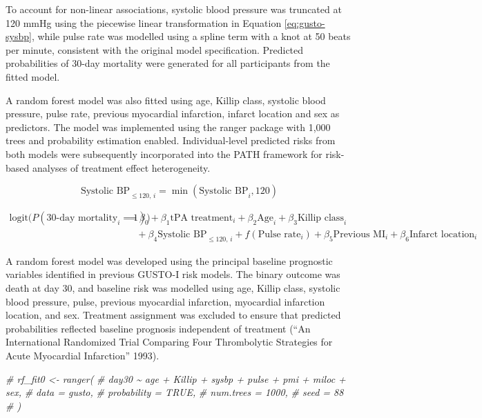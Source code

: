 \documentclass{article}
\newenvironment{Shaded}{\begin{snugshade}}{\end{snugshade}}
\newcommand{\CommentTok}[1]{\textcolor[rgb]{0.56,0.35,0.01}{\textit{#1}}}
\begin{document}
To account for non-linear associations, systolic blood pressure was
truncated at 120 mmHg using the piecewise linear transformation in
Equation \ref{eq:gusto-sysbp}, while pulse rate was modelled using a
spline term with a knot at 50 beats per minute, consistent with the
original model specification. Predicted probabilities of 30-day
mortality were generated for all participants from the fitted model.

A random forest model was also fitted using age, Killip class, systolic
blood pressure, pulse rate, previous myocardial infarction, infarct
location and sex as predictors. The model was implemented using the
ranger package with 1,000 trees and probability estimation enabled.
Individual-level predicted risks from both models were subsequently
incorporated into the PATH framework for risk-based analyses of
treatment effect heterogeneity.

\begin{equation}
\text{Systolic BP}_{\leq 120,\,i} = \min(\text{Systolic BP}_i, 120)
\label{eq:gusto-sysbp}
\end{equation}

\begin{equation}
\begin{aligned}
\text{logit}\big(P(\text{30-day mortality}_i = 1)\big)
&=
\beta_0
+ \beta_1 \text{tPA treatment}_i
+ \beta_2 \text{Age}_i
+ \beta_3 \text{Killip class}_i \\
&\quad
+ \beta_4 \text{Systolic BP}_{\leq 120,\,i}
+ f(\text{Pulse rate}_i)
+ \beta_5 \text{Previous MI}_i
+ \beta_6 \text{Infarct location}_i
\end{aligned}
\label{eq:gusto-logistic}
\end{equation}

A random forest model was developed using the principal baseline
prognostic variables identified in previous GUSTO-I risk models. The
binary outcome was death at day 30, and baseline risk was modelled using
age, Killip class, systolic blood pressure, pulse, previous myocardial
infarction, myocardial infarction location, and sex. Treatment
assignment was excluded to ensure that predicted probabilities reflected
baseline prognosis independent of treatment ({``An {International
Randomized Trial Comparing Four Thrombolytic Strategies} for {Acute
Myocardial Infarction}''} 1993).

\begin{Shaded}
\begin{Highlighting}[]
\CommentTok{\# rf\_fit0 \textless{}{-} ranger(}
\CommentTok{\#   day30 \textasciitilde{} age + Killip + sysbp + pulse + pmi + miloc + sex,}
\CommentTok{\#   data = gusto,}
\CommentTok{\#   probability = TRUE,}
\CommentTok{\#   num.trees = 1000,}
\CommentTok{\#   seed = 88}
\CommentTok{\# )}
\end{Highlighting}
\end{Shaded}
\end{document}

